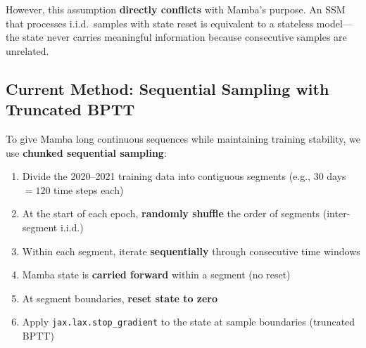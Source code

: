 \documentclass[11pt,a4paper]{article}
\begin{document}
However, this assumption \textbf{directly conflicts} with Mamba's purpose. An SSM that processes i.i.d.\ samples with state reset is equivalent to a stateless model---the state never carries meaningful information because consecutive samples are unrelated.

\subsection{Current Method: Sequential Sampling with Truncated BPTT}

To give Mamba long continuous sequences while maintaining training stability, we use \textbf{chunked sequential sampling}:

\begin{enumerate}[nosep]
  \item Divide the 2020--2021 training data into contiguous segments (e.g., 30 days $= 120$ time steps each)
  \item At the start of each epoch, \textbf{randomly shuffle} the order of segments (inter-segment i.i.d.)
  \item Within each segment, iterate \textbf{sequentially} through consecutive time windows
  \item Mamba state is \textbf{carried forward} within a segment (no reset)
  \item At segment boundaries, \textbf{reset state to zero}
  \item Apply \texttt{jax.lax.stop\_gradient} to the state at sample boundaries (truncated BPTT)
\end{enumerate}
\end{document}
